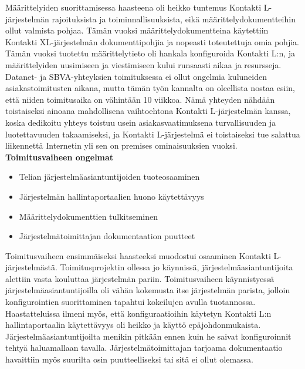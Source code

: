 \documentclass[finnish,12pt,a4paper,pdftex]{article}
\begin{document}
Määrittelyiden suorittamisessa haasteena oli heikko tuntemus Kontakti L-järjestelmän rajoituksista ja toiminnallisuuksista, eikä määrittelydokumentteihin ollut valmista pohjaa. Tämän vuoksi määrittelydokumentteina käytettiin Kontakti XL-järjestelmän dokumenttipohjia ja nopeasti toteutettuja omia pohjia. Tämän vuoksi tuotettu määrittelytieto oli hankala konfiguroida Kontakti L:n, ja määrittelyiden uusimiseen ja viestimiseen kului runsaasti aikaa ja resursseja.\\

Datanet- ja SBVA-yhteyksien toimituksessa ei ollut ongelmia kuluneiden asiakastoimitusten aikana, mutta tämän työn kannalta on oleellista nostaa esiin, että niiden toimitusaika on vähintään 10 viikkoa. Nämä yhteyden nähdään toistaiseksi ainoana mahdollisena vaihtoehtona Kontakti L-järjestelmän kanssa, koska dedikoitu yhteys toistuu usein asiakasvaatimuksena turvallisuuden ja luotettavuuden takaamiseksi, ja Kontakti L-järjestelmä ei toistaiseksi tue salattua liikennettä Internetin yli sen on premises ominaisuuksien vuoksi.\\

\textbf{Toimitusvaiheen ongelmat}\\

\begin{itemize}
    \item Telian järjestelmäasiantuntijoiden tuoteosaaminen
    \item Järjestelmän hallintaportaalien huono käytettävyys
    \item Määrittelydokumenttien tulkitseminen
    \item Järjestelmätoimittajan dokumentaation puutteet
\end{itemize}

Toimitusvaiheen ensimmäiseksi haasteeksi muodostui osaaminen Kontakti L-järjestelmästä. Toimitusprojektin ollessa jo käynnissä, järjestelmäasiantuntijoita alettiin vasta kouluttaa järjestelmän pariin. Toimitusvaiheen käynnistyessä järjestelmäasiantuntijoilla oli vähän kokemusta itse järjestelmän parista, jolloin konfigurointien suorittaminen tapahtui kokeilujen avulla tuotannossa. \\

Haastatteluissa ilmeni myös, että konfiguraatioihin käytetyn Kontakti L:n hallintaportaalin käytettävyys oli heikko ja käyttö epäjohdonmukaista. Järjestelmäasiantuntijoilta menikin pitkään ennen kuin he saivat konfiguroinnit tehtyä haluamallaan tavalla. Järjestelmätoimittajan tarjoama dokumentaatio havaittiin myös suurilta osin puutteelliseksi tai sitä ei ollut olemassa. \\
\end{document}
